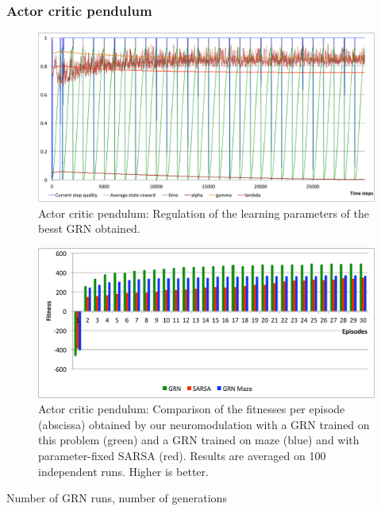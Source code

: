 \subsubsection{Actor critic pendulum}
\begin{figure}[h]
\center
\includegraphics[width=\linewidth]{ACP_GRNBehavior.pdf}
\caption{Actor critic pendulum: Regulation of the learning parameters of the besst GRN obtained.}\label{fig:ACP:GRNBehavior}
\end{figure}

\begin{figure}[h]
\includegraphics[width=\linewidth]{ACP_GRNvsSARSA.pdf}
\caption{Actor critic pendulum: Comparison of the fitnesses per episode (abscissa) obtained by our neuromodulation with a GRN trained on this problem (green) and a GRN trained on maze (blue) and with parameter-fixed SARSA (red). Results are averaged on 100 independent runs. Higher is better.}\label{fig:ACP:GRNvsSARSA}
\end{figure}

Number of GRN runs, number of generations

